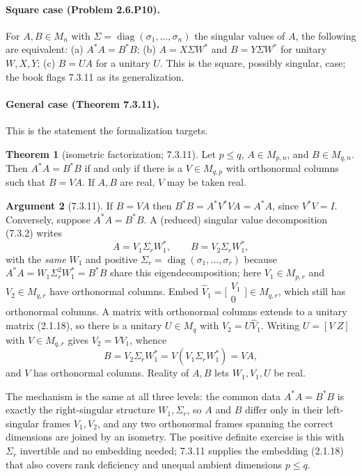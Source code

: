 \documentclass[11pt]{article}
\newcommand{\M}{M}
\newcommand{\adj}{^{*}}
\DeclareMathOperator{\diag}{diag}
\theoremstyle{definition}
\newtheorem{theorem}{Theorem}[section]
\newtheorem{argument}[theorem]{Argument}
\begin{document}
\paragraph{Square case (Problem 2.6.P10).}
For $A,B\in\M_n$ with $\Sigma=\diag(\sigma_1,\dots,\sigma_n)$ the singular values
of $A$, the following are equivalent: (a) $A\adj A=B\adj B$; (b) $A=X\Sigma W\adj$
and $B=Y\Sigma W\adj$ for unitary $W,X,Y$; (c) $B=UA$ for a unitary $U$.  This is
the square, possibly singular, case; the book flags 7.3.11 as its generalization.

\paragraph{General case (Theorem 7.3.11).}
This is the statement the formalization targets.

\begin{theorem}[isometric factorization; 7.3.11]
Let $p\le q$, $A\in\M_{p,n}$, and $B\in\M_{q,n}$.  Then $A\adj A=B\adj B$ if and
only if there is a $V\in\M_{q,p}$ with orthonormal columns such that $B=VA$.  If
$A,B$ are real, $V$ may be taken real.
\end{theorem}

\begin{argument}[7.3.11]
If $B=VA$ then $B\adj B=A\adj V\adj VA=A\adj A$, since $V\adj V=I$.  Conversely,
suppose $A\adj A=B\adj B$.  A (reduced) singular value decomposition (7.3.2) writes
\[
  A=V_1\Sigma_r W_1\adj,\qquad B=V_2\Sigma_r W_1\adj,
\]
with the \emph{same} $W_1$ and positive $\Sigma_r=\diag(\sigma_1,\dots,\sigma_r)$
because $A\adj A=W_1\Sigma_r^2W_1\adj=B\adj B$ share this eigendecomposition; here
$V_1\in\M_{p,r}$ and $V_2\in\M_{q,r}$ have orthonormal columns.  Embed
$\widehat V_1=\bigl[\begin{smallmatrix}V_1\\ 0\end{smallmatrix}\bigr]\in\M_{q,r}$,
which still has orthonormal columns.  A matrix with orthonormal columns extends to
a unitary matrix (2.1.18), so there is a unitary $U\in\M_q$ with
$V_2=U\widehat V_1$.  Writing $U=[V\ Z]$ with $V\in\M_{q,r}$ gives
$V_2=V V_1$, whence
\[
  B=V_2\Sigma_r W_1\adj=V(V_1\Sigma_r W_1\adj)=VA,
\]
and $V$ has orthonormal columns.  Reality of $A,B$ lets $W_1,V_1,U$ be real.
\end{argument}

The mechanism is the same at all three levels: the common data $A\adj A=B\adj B$
is exactly the right-singular structure $W_1,\Sigma_r$, so $A$ and $B$ differ only
in their left-singular frames $V_1,V_2$, and any two orthonormal frames spanning
the correct dimensions are joined by an isometry.  The positive definite exercise
is this with $\Sigma_r$ invertible and no embedding needed; 7.3.11 supplies the
embedding (2.1.18) that also covers rank deficiency and unequal ambient
dimensions $p\le q$.
\end{document}
